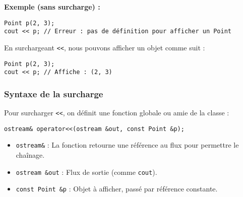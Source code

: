 \textbf{Exemple (sans surcharge) :}
\begin{tcolorbox}[colframe=blue!50!black, colback=blue!5!white, title=Exemple sans Surcharge de Flux]
\begin{verbatim}
Point p(2, 3);
cout << p; // Erreur : pas de définition pour afficher un Point
\end{verbatim}
\end{tcolorbox}

En surchargeant \texttt{<<}, nous pouvons afficher un objet comme suit :
\begin{tcolorbox}[colframe=blue!50!black, colback=blue!5!white, title=Exemple avec Surcharge de Flux]
\begin{verbatim}
Point p(2, 3);
cout << p; // Affiche : (2, 3)
\end{verbatim}
\end{tcolorbox}

\subsubsection{ Syntaxe de la surcharge}
Pour surcharger \texttt{<<}, on définit une fonction globale ou amie de la classe :

\begin{tcolorbox}[colframe=blue!50!black, colback=blue!5!white, title=Syntaxe de la Surcharge de Flux]
\begin{verbatim}
ostream& operator<<(ostream &out, const Point &p);
\end{verbatim}
\end{tcolorbox}

\begin{itemize}
    \item \texttt{ostream\&} : La fonction retourne une référence au flux pour permettre le chaînage.
    \item \texttt{ostream \&out} : Flux de sortie (comme \texttt{cout}).
    \item \texttt{const Point \&p} : Objet à afficher, passé par référence constante.
\end{itemize}

